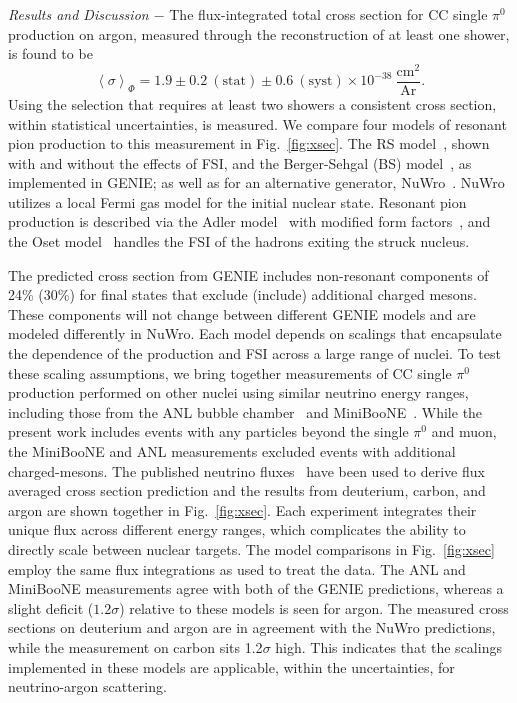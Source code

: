 \documentclass[%
 reprint,
superscriptaddress,
amsmath,amssymb,
prl,
floatfix,
]{revtex4-1}
\newcommand{\pio}{\pi^{0}}
\newcommand{\cm}{\text{cm}}
\newcommand{\ar}{\text{Ar}}
\begin{document}
{\it Results and Discussion $-$ } The flux-integrated total cross section for CC single $\pio$ production on argon, measured through the reconstruction of at least one shower, is found to be
\begin{equation*}
\left\langle\sigma\right\rangle_{\Phi}=1.9\pm0.2~(\text{stat})\pm0.6~(\text{syst})\times10^{-38}~\frac{\cm^2}{\ar}.
\end{equation*}
\noindent Using the selection that requires at least two showers a consistent cross section, within statistical uncertainties, is measured. We compare four models of resonant pion production to this measurement in Fig.~\ref{fig:xsec}. The RS model~\cite{rs}, shown with and without the effects of FSI, and the Berger-Sehgal (BS) model~\cite{bs}, as implemented in GENIE; as well as for an alternative generator, {\sc NuWro}~\cite{nuwro}. {\sc NuWro} utilizes a local Fermi gas model for the initial nuclear state. Resonant pion production is described via the Adler model~\cite{adler1,adler2} with modified form factors~\cite{nuwroFF}, and the Oset model~\cite{oset} handles the FSI of the hadrons exiting the struck nucleus.  

The predicted cross section from GENIE includes non-resonant components of 24\% (30\%) for final states that exclude (include) additional charged mesons.  These components will not change between different GENIE models and are modeled differently in {\sc NuWro}. Each model depends on scalings that encapsulate the dependence of the production and FSI across a large range of nuclei. To test these scaling assumptions, we bring together measurements of CC single $\pio$ production performed on other nuclei using similar neutrino energy ranges, including those from the ANL bubble chamber~\cite{bub_anl} and MiniBooNE~\cite{mbpi0}. While the present work includes events with any particles beyond the
single $\pio$ and muon, the MiniBooNE and ANL measurements excluded events with additional charged-mesons. The published neutrino fluxes~\cite{bnb,anl_flux,nuis} have been used to derive flux averaged cross section prediction and the results from deuterium, carbon, and argon are shown together in Fig.~\ref{fig:xsec}. 
Each experiment integrates their unique flux across different energy ranges, which complicates the ability to directly scale between nuclear targets. The model comparisons in Fig.~\ref{fig:xsec} employ the same flux integrations as used to treat the data.
The ANL and MiniBooNE measurements agree with both of the GENIE predictions, whereas a slight deficit ($1.2\sigma$) relative to these models is seen for argon. The measured cross sections on deuterium and argon are in agreement with the {\sc NuWro} predictions, while the measurement on carbon sits 1.2$\sigma$ high. This indicates that the scalings implemented in these models are applicable, within the uncertainties, for neutrino-argon scattering. 
\end{document}
